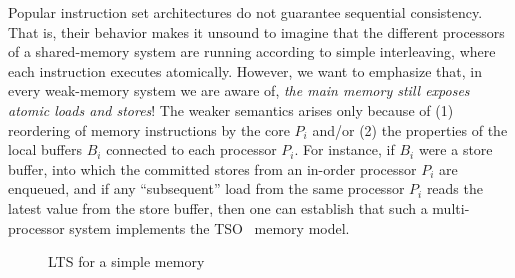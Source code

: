 %
%

Popular instruction set architectures do not guarantee sequential
consistency.  That is, their behavior makes it unsound to imagine that
the different processors of a shared-memory system are running
according to simple interleaving, where each instruction executes
atomically.  However, we want to emphasize that, in every weak-memory
system we are aware of, \emph{the main memory still exposes atomic
  loads and stores}!  The weaker semantics arises only because of (1)
reordering of memory instructions by the core $P_i$ and/or (2) the
properties of the local buffers $B_i$ connected to each processor
$P_i$.  For instance, if $B_i$ were a store buffer, into which the
committed stores from an in-order processor $P_i$ are enqueued, and if
any ``subsequent'' load from the same processor $P_i$ reads the latest
value from the store buffer, then one can establish that such a
multi-processor system implements the TSO~\cite{x86tsocacm10} memory
model.

\begin{figure}
\small
\centering
\begin{boxedminipage}[c]{.48\textwidth}
\inference
[Ins]
{}
{}

{}

{}

{}%

\end{boxedminipage}
\caption{LTS for a simple memory}
\label{$M_m$}
\end{figure}

